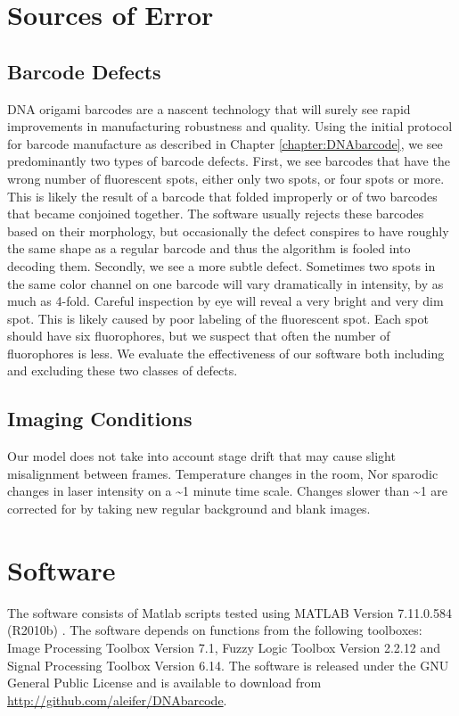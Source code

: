 \section{Sources of Error}

\subsection{Barcode Defects}
DNA origami barcodes are a nascent technology that will surely see rapid improvements in manufacturing robustness and quality. Using the initial protocol for barcode manufacture as described in Chapter \ref{chapter:DNAbarcode}, we see predominantly two types of barcode defects. First, we see barcodes that have the wrong number of fluorescent spots, either only two spots, or four spots or more. This is likely the result of a barcode that folded improperly or of two barcodes that became conjoined together. The software usually rejects these barcodes based on their morphology, but occasionally the defect conspires to have roughly the same shape as a regular barcode and thus the algorithm is fooled into decoding them. Secondly, we see a more subtle defect. Sometimes two spots in the same color channel on one barcode will vary dramatically in intensity, by as much as 4-fold. Careful inspection by eye will reveal a very bright and very dim spot. This is likely caused by poor labeling of the fluorescent spot. Each spot should have six fluorophores, but we suspect that often the number of fluorophores is less. We evaluate the effectiveness of our software both including and excluding these two classes of defects.    


\subsection{Imaging Conditions}
Our model does not take into account stage drift that may cause slight misalignment between frames. 
Temperature changes in the room, Nor sparodic changes in laser intensity on a \textasciitilde1 minute time scale. Changes slower than \textasciitilde1 are corrected for by taking new regular background and blank images.
 
\section{Software}
The software consists of Matlab scripts tested using MATLAB Version 7.11.0.584 (R2010b) \citep{matlab_version_2010}. The software depends on functions from the following toolboxes: Image Processing Toolbox Version 7.1, Fuzzy Logic Toolbox Version 2.2.12 and Signal Processing Toolbox Version 6.14. The software is released under the GNU General Public License and is available to download from \url{http://github.com/aleifer/DNAbarcode}.

